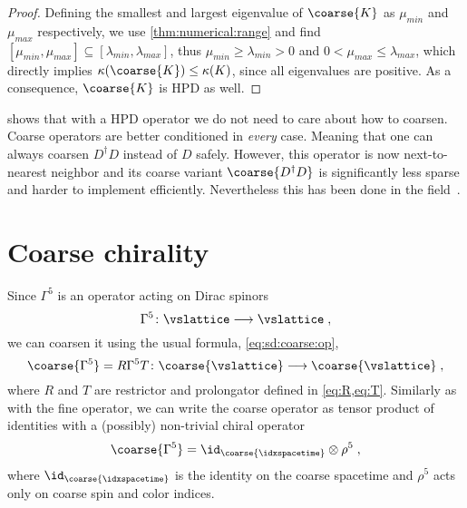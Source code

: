 \begin{proof}
Defining the smallest and largest eigenvalue of $\coarse{K}$ as $\mu_{min}$ and $\mu_{max}$ respectively, we use \cref{thm:numerical:range} and find $[ \mu_{min}, \mu_{max}] \subseteq [ \lambda_{min}, \lambda_{max} ]$, thus $\mu_{min} \geq \lambda_{min} > 0$ and $0 < \mu_{max} \leq \lambda_{max}$, which directly implies $\kappa(\coarse{K}) \leq \kappa(K)$, since all eigenvalues are positive. As a consequence, $\coarse{K}$ is HPD as well.
\end{proof}

 shows that with a HPD operator we do not need to care about how to coarsen.
Coarse operators are better conditioned in \emph{every} case.
Meaning that one can always coarsen $D^{\dagger} D$ instead of $D$ safely.
However, this operator is now next-to-nearest neighbor and its coarse variant $\coarse{D^{\dagger} D}$ is significantly less sparse and harder to implement efficiently.
Nevertheless this has been done in the field~\cite{Cohen:2011ivh,Boyle:2014rwa}.

\section{Coarse chirality}

Since $\Gamma^5$ is an operator acting on Dirac spinors
\begin{equation}
\Gamma^5 \colon \vslattice \longrightarrow \vslattice \;,
\end{equation}
we can coarsen it using the usual formula, \cref{eq:sd:coarse:op},
\begin{equation}
\coarse{\Gamma^5} = R \Gamma^5 T \colon \coarse{\vslattice} \longrightarrow \coarse{\vslattice} \;,
\end{equation}
where $R$ and $T$ are restrictor and prolongator defined in \cref{eq:R,eq:T}.
Similarly as with the fine operator, we can write the coarse operator as tensor product of identities with a (possibly) non-trivial chiral operator
\begin{equation}
\coarse{\Gamma^5} = \id_{\coarse{\idxspacetime}} \otimes \rho^5 \;,
\end{equation}
where $\id_{\coarse{\idxspacetime}}$ is the identity on the coarse spacetime and $\rho^{5}$ acts only on coarse spin and color indices.

